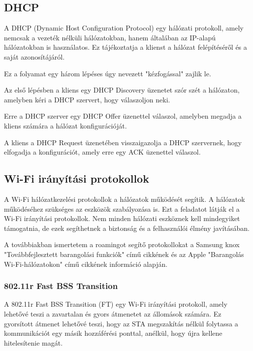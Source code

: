 \documentclass[12pt]{article}
\begin{document}
\subsection{DHCP}

A DHCP (Dynamic Host Configuration Protocol) egy hálózati protokoll, amely nemcsak a vezeték nélküli hálózatokban, hanem általában az IP-alapú hálózatokban is használatos. Ez tájékoztatja a klienst a hálózat felépítéséről és a saját azonosítájáról.

Ez a folyamat egy három lépéses úgy nevezett "kézfogással" zajlik le.

Az első lépésben a kliens egy DHCP Discovery üzenetet szór szét a hálózaton, amelyben kéri a DHCP szervert, hogy válaszoljon neki.

Erre a DHCP szerver egy DHCP Offer üzenettel válaszol, amelyben megadja a kliens számára a hálózat konfigurációját.

A kliens a DHCP Request üzenetében visszaigazolja a DHCP szervernek, hogy elfogadja a konfigurációt, amely erre egy ACK üzenettel válaszol.


\subsection{Wi-Fi irányítási protokollok}

A Wi-Fi hálózatkezelési protokollok a hálózatok működését segítik. A hálózatok működéséhez szükséges az eszközök szabályozása is. Ezt a feladatot látják el a Wi-Fi irányítási protokollok. Nem minden hálózati eszköznek kell mindegyiket támogatnia, de ezek segíthetnek a biztonság és a felhasználói élmény javításában.


A továbbiakban ismertetem a roamingot segítő protokollokat a Samsung knox "Továbbfejlesztett barangolási funkciók" című cikkének \cite{samsung_roaming} és az Apple "Barangolás Wi-Fi-hálózatokon" című cikkének információ alapján. \cite{apple_roaming}

\subsubsection{802.11r Fast BSS Transition}

A 802.11r Fast BSS Transition (FT) egy Wi-Fi irányítási protokoll, amely lehetővé teszi a zavartalan és gyors átmenetet az állomások számára.
Ez gyorsított átmenet lehetővé teszi, hogy az STA megszakítás nélkül folytassa a kommunikációt egy másik hozzáférési ponttal, anélkül, hogy újra kellene hitelesítenie magát.
\end{document}
